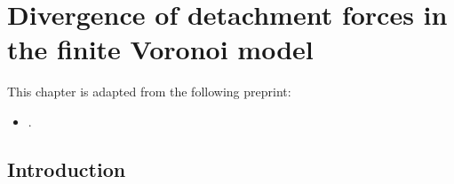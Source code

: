 \chapter{Divergence of detachment forces in the finite Voronoi model}
\label{chap:voronoi}

\begin{singlespace}
    This chapter is adapted from the following preprint:
    \begin{itemize}
        \item {}.
    \end{itemize}
\end{singlespace}


\section{Introduction}
\label{sec:ch4:intro}

